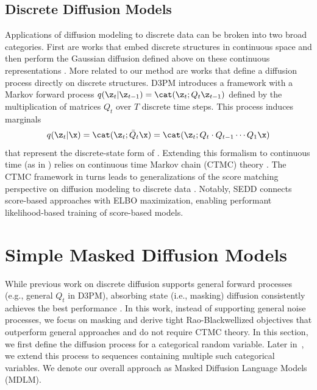 \documentclass{article} %
\begin{document}
\subsection{Discrete Diffusion Models}\label{subsec:background_discrete}
Applications of diffusion modeling to discrete data can be broken into two broad categories.
First are works that embed discrete structures in continuous space and then perform the Gaussian diffusion defined above on these continuous representations \citep{chen2022analog, dieleman2022continuous, 
gulrajani2024plaid, han2022ssd, li2022diffusion, lovelace2024latent, strudel2022self}.
More related to our method are works that define a diffusion process directly on discrete structures.
D3PM \citep{austin2021structured} introduces a framework with a  Markov forward process $q(\z_t | \z_{t-1}) = \cat( \z_t ; Q_t \z_{t-1})$ defined by the multiplication of matrices $Q_t$ over $T$ discrete time steps.
This process induces marginals
\begin{equation} \label{eq:d3pm_maginal}
    q(\z_t | \x) = \cat(\z_t ; \bar Q_t \x)  = \cat(\z_t ; Q_t \cdot Q_{t-1} \cdots Q_1 \x)
\end{equation}
that represent the discrete-state form of .
Extending this formalism to continuous time (as in ) relies on continuous time Markov chain (CTMC) theory
\cite{campbell2022continuous}.
The CTMC framework in turns leads to generalizations of the score matching perspective on diffusion modeling \citep{song2019generative} to discrete data \citep{ lou2023discrete, sun2022score}.
Notably,
SEDD \citep{lou2023discrete} connects score-based approaches with ELBO maximization, enabling performant likelihood-based training of score-based models.







\section{Simple Masked Diffusion Models}
While previous work on discrete diffusion supports general forward processes (e.g., general $Q_t$ in D3PM), absorbing state (i.e., masking) diffusion consistently achieves the best performance \citep{austin2021structured, lou2023discrete}.
In this work, instead of supporting general noise processes, we 
focus on masking and derive tight Rao-Blackwellized objectives that outperform general approaches and do not require CTMC theory. 
In this section, we first define the diffusion process for a categorical random variable. Later in~, we extend this process to sequences containing multiple such categorical variables. We denote our overall approach as Masked Diffusion Language Models (MDLM).
\end{document}

